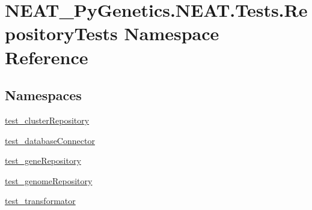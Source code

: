 \hypertarget{namespaceNEAT__PyGenetics_1_1NEAT_1_1Tests_1_1RepositoryTests}{}\section{N\+E\+A\+T\+\_\+\+Py\+Genetics.\+N\+E\+A\+T.\+Tests.\+Repository\+Tests Namespace Reference}
\label{namespaceNEAT__PyGenetics_1_1NEAT_1_1Tests_1_1RepositoryTests}
\subsection*{Namespaces}
\begin{DoxyCompactItemize}
\item 
 \hyperlink{namespaceNEAT__PyGenetics_1_1NEAT_1_1Tests_1_1RepositoryTests_1_1test__clusterRepository}{test\+\_\+cluster\+Repository}
\item 
 \hyperlink{namespaceNEAT__PyGenetics_1_1NEAT_1_1Tests_1_1RepositoryTests_1_1test__databaseConnector}{test\+\_\+database\+Connector}
\item 
 \hyperlink{namespaceNEAT__PyGenetics_1_1NEAT_1_1Tests_1_1RepositoryTests_1_1test__geneRepository}{test\+\_\+gene\+Repository}
\item 
 \hyperlink{namespaceNEAT__PyGenetics_1_1NEAT_1_1Tests_1_1RepositoryTests_1_1test__genomeRepository}{test\+\_\+genome\+Repository}
\item 
 \hyperlink{namespaceNEAT__PyGenetics_1_1NEAT_1_1Tests_1_1RepositoryTests_1_1test__transformator}{test\+\_\+transformator}
\end{DoxyCompactItemize}
